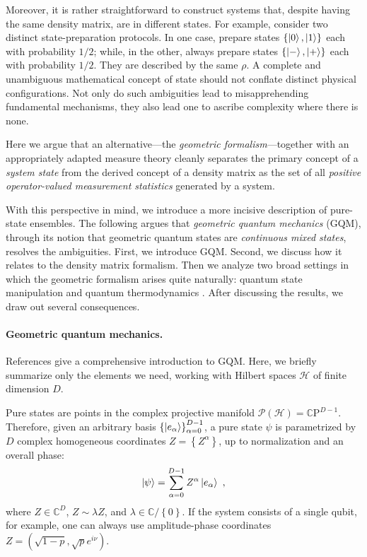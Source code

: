 \documentclass[nofootinbib,pre,twocolumn,showpacs,showkeys,groupaddress,preprintnumbers,floatfix]{revtex4-1}
\newcommand{\1}{\mathbbm{1}}
\begin{document}
Moreover, it is rather straightforward to construct systems that, despite
having the same density matrix, are in different states. For example, consider
two distinct state-preparation protocols. In one case, prepare states
$\{\ket{0},\ket{1}\}$ each with probability $1/2$; while, in the other, always
prepare states $\{\ket{-},\ket{+}\}$ each with probability $1/2$. They are
described by the same $\rho$. A complete and unambiguous mathematical concept
of state should not conflate distinct physical configurations. Not only
do such ambiguities lead to misapprehending fundamental mechanisms, they also
lead one to ascribe complexity where there is none.

Here we argue that an alternative---the \emph{geometric formalism}---together
with an appropriately adapted measure theory cleanly separates the primary
concept of a \emph{system state} from the derived concept of a density matrix
as the set of all \emph{positive operator-valued measurement statistics} generated by a system.

With this perspective in mind, we introduce a more incisive description of pure-state ensembles. 
The following argues that \emph{geometric quantum mechanics} (GQM), through its notion that 
geometric quantum states are \emph{continuous mixed states}, resolves the ambiguities. First, 
we introduce GQM. Second, we discuss how it relates to the density matrix formalism. Then we 
analyze two broad settings in which the geometric formalism arises quite naturally: quantum state 
manipulation \cite{Anza20c} and quantum thermodynamics \cite{Anza20b}. After discussing the results, 
we draw out several consequences.

\paragraph*{Geometric quantum mechanics.}
\label{sec:GQM}
References
\cite{STROCCHI1966,Kibble1979,Heslot1985,Gibbons1992,Ashtekar1995,Ashtekar1999,Brody2001,Bengtsson2017,Carinena2007,Chruscinski2006,Marmo2010,Avron2020,Pastorello2015,Pastorello2015a,Pastorello2016,Clemente-Gallardo2013}
give a comprehensive introduction to GQM. Here, we briefly summarize only the
elements we need, working with Hilbert spaces $\mathcal{H}$ of finite dimension $D$.

Pure states are points in the complex projective manifold $\mathcal{P}\left(
\mathcal{H} \right)=\mathbb{C}\mathrm{P}^{D-1}$. Therefore, given an arbitrary
basis $\left\{\ket{e_\alpha} \right\}_{\alpha=0}^{D-1}$, a pure state $\psi$ is
parametrized by $D$ complex homogeneous coordinates $Z = \left\{      Z^\alpha\right\}$, up to
normalization and an overall phase:
\begin{align*}
\ket{\psi} = \sum_{\alpha=0}^{D-1} Z^\alpha \ket{e_\alpha}
  ~,
\end{align*}
where $Z \in \mathbb{C}^{D}$, $Z \sim \lambda Z$, and $\lambda \in
\mathbb{C}/\left\{ 0\right\}$. If the system consists of a single qubit, for
example, one can always use amplitude-phase coordinates $Z = (\sqrt{1-p},\sqrt{p} e^{i\nu})$.
\end{document}

